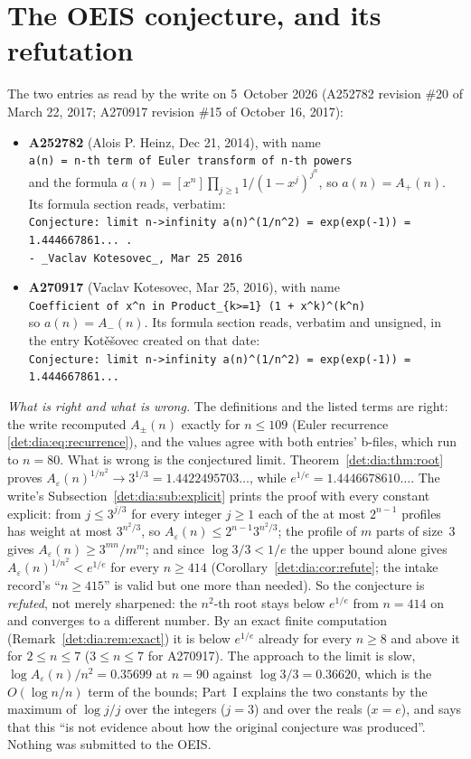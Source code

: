 \documentclass[11pt,letterpaper]{article}
\numberwithin{equation}{section}
\theoremstyle{definition}\newtheorem{definition}[theorem]{Definition}
\theoremstyle{remark}\newtheorem{remark}[theorem]{Remark}
\newcommand{\eps}{\varepsilon}
\begin{document}
\section*{The OEIS conjecture, and its refutation}\label{det:sec:oeis}
The two entries as read by the write on 5~October 2026 (A252782 revision \#20 of March 22, 2017; A270917 revision \#15 of October 16, 2017):
\begin{itemize}
\item \textbf{A252782} (Alois P. Heinz, Dec 21, 2014), with name\\
\verb!a(n) = n-th term of Euler transform of n-th powers!\\
and the formula $a(n)=[x^n]\prod_{j\ge1}1/(1-x^j)^{j^n}$, so $a(n)=A_+(n)$. Its formula section reads, verbatim:\\
\verb!Conjecture: limit n->infinity a(n)^(1/n^2) = exp(exp(-1)) = 1.444667861... .!\\
\verb!- _Vaclav Kotesovec_, Mar 25 2016!
\item \textbf{A270917} (Vaclav Kotesovec, Mar 25, 2016), with name\\
\verb!Coefficient of x^n in Product_{k>=1} (1 + x^k)^(k^n)!\\
so $a(n)=A_-(n)$. Its formula section reads, verbatim and unsigned, in the entry Kot\v{e}\v{s}ovec created on that date:\\
\verb!Conjecture: limit n->infinity a(n)^(1/n^2) = exp(exp(-1)) = 1.444667861...!
\end{itemize}
\emph{What is right and what is wrong.} The definitions and the listed terms are right: the write recomputed $A_\pm(n)$ exactly for $n\le109$ (Euler recurrence \eqref{det:dia:eq:recurrence}), and the values agree with both entries' b-files, which run to $n=80$. What is wrong is the conjectured limit. Theorem~\ref{det:dia:thm:root} proves $A_\eps(n)^{1/n^2}\to3^{1/3}=1.4422495703\ldots$, while $e^{1/e}=1.4446678610\ldots$. The write's Subsection~\ref{det:dia:sub:explicit} prints the proof with every constant explicit: from $j\le3^{j/3}$ for every integer $j\ge1$ each of the at most $2^{n-1}$ profiles has weight at most $3^{n^2/3}$, so $A_\eps(n)\le2^{n-1}3^{n^2/3}$; the profile of $m$ parts of size~3 gives $A_\eps(n)\ge3^{mn}/m^m$; and since $\log3/3<1/e$ the upper bound alone gives $A_\eps(n)^{1/n^2}<e^{1/e}$ for every $n\ge414$ (Corollary~\ref{det:dia:cor:refute}; the intake record's ``$n\ge415$'' is valid but one more than needed). So the conjecture is \emph{refuted}, not merely sharpened: the $n^2$-th root stays below $e^{1/e}$ from $n=414$ on and converges to a different number. By an exact finite computation (Remark~\ref{det:dia:rem:exact}) it is below $e^{1/e}$ already for every $n\ge8$ and above it for $2\le n\le7$ ($3\le n\le7$ for A270917). The approach to the limit is slow, $\log A_\eps(n)/n^2=0.35699$ at $n=90$ against $\log3/3=0.36620$, which is the $O(\log n/n)$ term of the bounds; Part~I explains the two constants by the maximum of $\log j/j$ over the integers ($j=3$) and over the reals ($x=e$), and says that this ``is not evidence about how the original conjecture was produced''. Nothing was submitted to the OEIS.
\end{document}
